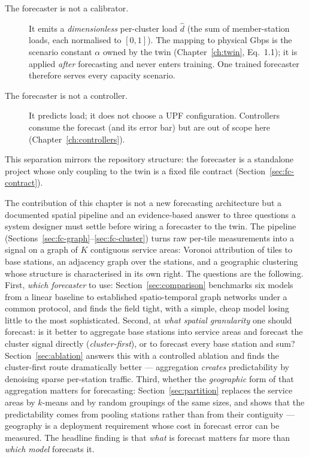 \begin{description}
  \item[The forecaster is not a calibrator.] It emits a \emph{dimensionless} per-cluster load
  $\hat{d}$ (the sum of member-station loads, each normalised to $[0,1]$). The mapping to physical Gbps is the scenario constant $\alpha$ owned by
  the twin (Chapter~\ref{ch:twin}, Eq.~1.1); it is applied \emph{after} forecasting and never
  enters training. One trained forecaster therefore serves every capacity scenario.
  \item[The forecaster is not a controller.] It predicts load; it does not choose a UPF
  configuration. Controllers consume the forecast (and its error bar) but are out of scope here
  (Chapter~\ref{ch:controllers}).
\end{description}

This separation mirrors the repository structure: the forecaster is a standalone project whose
only coupling to the twin is a fixed file contract (Section~\ref{sec:fc-contract}).

The contribution of this chapter is not a new forecasting architecture but a documented spatial
pipeline and an evidence-based answer to three questions a system designer must settle before wiring a
forecaster to the twin. The pipeline (Sections~\ref{sec:fc-graph}--\ref{sec:fc-cluster}) turns raw
per-tile measurements into a signal on a graph of $K$ contiguous service areas: Voronoi attribution of
tiles to base stations, an adjacency graph over the stations, and a geographic clustering whose
structure is characterised in its own right. The questions are the following. First, \emph{which
forecaster} to use: Section~\ref{sec:comparison} benchmarks six models from a linear baseline to
established spatio-temporal graph networks under a common protocol, and finds the field tight, with a
simple, cheap model losing little to the most sophisticated. Second, at \emph{what spatial granularity}
one should forecast: is it better to aggregate base stations into service areas and forecast the
cluster signal directly (\emph{cluster-first}), or to forecast every base station and sum?
Section~\ref{sec:ablation} answers this with a controlled ablation and finds the cluster-first route
dramatically better --- aggregation \emph{creates} predictability by denoising sparse per-station
traffic. Third, whether the \emph{geographic} form of that aggregation matters for forecasting:
Section~\ref{sec:partition} replaces the service areas by $k$-means and by random groupings of the
same sizes, and shows that the predictability comes from pooling stations rather than from their
contiguity --- geography is a deployment requirement whose cost in forecast error can be measured. The
headline finding is that \emph{what} is forecast matters far more than \emph{which model} forecasts it.


